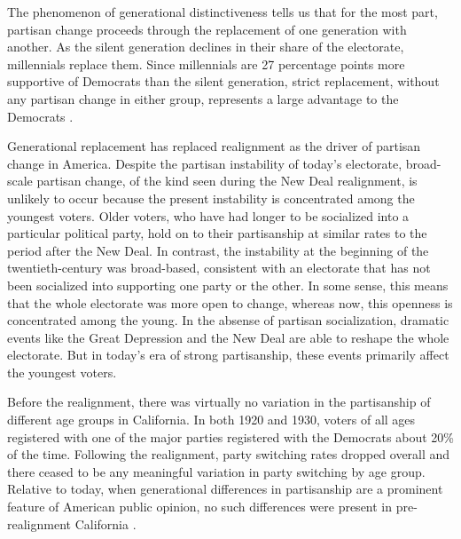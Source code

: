 \documentclass[11pt]{scrartcl}\usepackage[]{graphicx}\usepackage[]{color}
\begin{document}
The phenomenon of generational distinctiveness tells us that for the most part, partisan change proceeds through the replacement of one generation with another. As the silent generation declines in their share of the electorate, millennials replace them. Since millennials are 27 percentage points more supportive of Democrats than the silent generation, strict replacement, without any partisan change in either group, represents a large advantage to the Democrats \citep{bonica2018whats}. 

Generational replacement has replaced realignment as the driver of partisan change in America. Despite the partisan instability of today's electorate, broad-scale partisan change, of the kind seen during the New Deal realignment, is unlikely to occur because the present instability is concentrated among the youngest voters. Older voters, who have had longer to be socialized into a particular political party, hold on to their partisanship at similar rates to the period after the New Deal. In contrast, the instability at the beginning of the twentieth-century was broad-based, consistent with an electorate that has not been socialized into supporting one party or the other. In some sense, this means that the whole electorate was more open to change, whereas now, this openness is concentrated among the young. In the absense of partisan socialization, dramatic events like the Great Depression and the New Deal are able to reshape the whole electorate. But in today's era of strong partisanship, these events primarily affect the youngest voters.

Before the realignment, there was virtually no variation in the partisanship of different age groups in California. In both 1920 and 1930, voters of all ages registered with one of the major parties registered with the Democrats about 20\% of the time.  Following the realignment, party switching rates dropped overall and there ceased to be any meaningful variation in party switching by age group. Relative to today, when generational differences in partisanship are a prominent feature of American public opinion, no such differences were present in pre-realignment California \citep{bartels2014generational}. 
\end{document}

